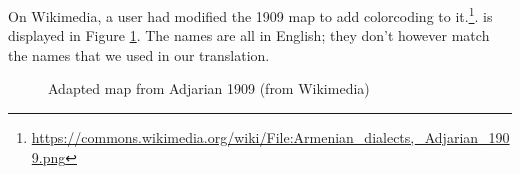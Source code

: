 On Wikimedia, a user had modified the 1909 map to add colorcoding to it.\footnote{\url{https://commons.wikimedia.org/wiki/File:Armenian_dialects,_Adjarian_1909.png}}.   is displayed in Figure \ref{map:Adjarian1909color}. The names are all in English; they don't however match the names that we used in our translation. 



\begin{figure}[H]
	\caption{Adapted map from Adjarian 1909 (from Wikimedia)}
	\label{map:Adjarian1909color}
\end{figure}
